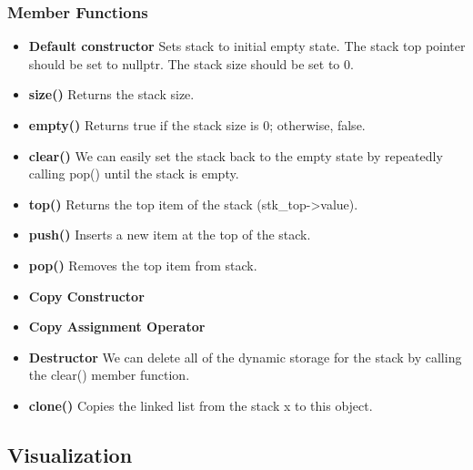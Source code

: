 \documentclass{report}
\begin{document}
    \subsubsection{Member Functions}
    \begin{itemize}
        \item \textbf{Default constructor} Sets stack to initial empty state. The stack top pointer should be set to nullptr. The stack size should be set to 0.
        \item \textbf{size()} Returns the stack size.
        \item \textbf{empty()} Returns true if the stack size is 0; otherwise, false.
        \item \textbf{clear()} We can easily set the stack back to the empty state by repeatedly calling pop() until the stack is empty.
        \item \textbf{top()} Returns the top item of the stack (stk\_top->value).
        \item \textbf{push()} Inserts a new item at the top of the stack.
        \item \textbf{pop()} Removes the top item from stack.
        \item \textbf{Copy Constructor}
        \item \textbf{Copy Assignment Operator}
        \item \textbf{Destructor} We can delete all of the dynamic storage for the stack by calling the clear() member function.
        \item \textbf{clone()} Copies the linked list from the stack x to this object.
    \end{itemize}

    \pagebreak 
    \subsection{Visualization}
        \bigbreak \noindent 
    \begin{figure}[ht]
        \centering
        \label{fig:vis3}
    \end{figure}

    \pagebreak
\end{document}
